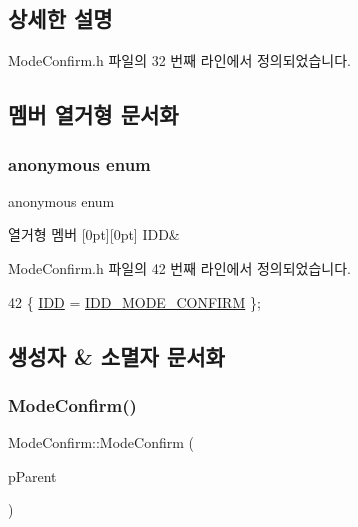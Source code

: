 \subsection{상세한 설명}


Mode\+Confirm.\+h 파일의 32 번째 라인에서 정의되었습니다.



\subsection{멤버 열거형 문서화}
\mbox{\label{class_mode_confirm_a8e439d67303e9c4b5eabe35621f0b130}} 
\subsubsection{\texorpdfstring{anonymous enum}{anonymous enum}}
{\footnotesize\ttfamily anonymous enum}

\begin{DoxyEnumFields}{열거형 멤버}
[0pt][0pt]{}\mbox{\label{class_mode_confirm_a8e439d67303e9c4b5eabe35621f0b130a24889350f357e37d8f7359dfdf7b5ae5}} 
I\+DD&\\
\hline

\end{DoxyEnumFields}


Mode\+Confirm.\+h 파일의 42 번째 라인에서 정의되었습니다.


\begin{DoxyCode}
42 \{ \mbox{\hyperlink{class_mode_confirm_a8e439d67303e9c4b5eabe35621f0b130a24889350f357e37d8f7359dfdf7b5ae5}{IDD}} = \mbox{\hyperlink{resource_8h_a4f5e436377cbbf99da53b1c77e2a5fa3}{IDD\_MODE\_CONFIRM}} \};
\end{DoxyCode}


\subsection{생성자 \& 소멸자 문서화}
\mbox{\label{class_mode_confirm_ae1f0d757ed04ed5e6f5455a94bff868d}} 
\subsubsection{\texorpdfstring{Mode\+Confirm()}{ModeConfirm()}}
{\footnotesize\ttfamily Mode\+Confirm\+::\+Mode\+Confirm (\begin{DoxyParamCaption}\item[{C\+Wnd $\ast$}]{p\+Parent }\end{DoxyParamCaption})}



